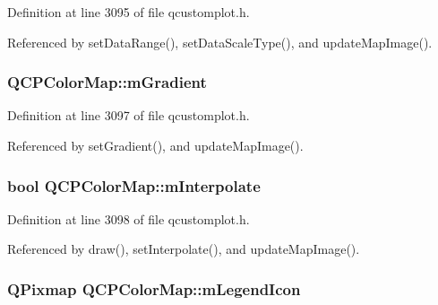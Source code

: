 Definition at line 3095 of file qcustomplot.\+h.



Referenced by set\+Data\+Range(), set\+Data\+Scale\+Type(), and update\+Map\+Image().

\hypertarget{class_q_c_p_color_map_aab77fe9a8df6f0486ab3507cc5f278fa}{}
\subsubsection[{m\+Gradient}]{ Q\+C\+P\+Color\+Map\+::m\+Gradient\hspace{0.3cm}{\ttfamily [protected]}}\label{class_q_c_p_color_map_aab77fe9a8df6f0486ab3507cc5f278fa}


Definition at line 3097 of file qcustomplot.\+h.



Referenced by set\+Gradient(), and update\+Map\+Image().

\hypertarget{class_q_c_p_color_map_af77e5eba9a844592648edeb6fbe834f1}{}
\subsubsection[{m\+Interpolate}]{\setlength{\rightskip}{0pt plus 5cm}bool Q\+C\+P\+Color\+Map\+::m\+Interpolate\hspace{0.3cm}{\ttfamily [protected]}}\label{class_q_c_p_color_map_af77e5eba9a844592648edeb6fbe834f1}


Definition at line 3098 of file qcustomplot.\+h.



Referenced by draw(), set\+Interpolate(), and update\+Map\+Image().

\hypertarget{class_q_c_p_color_map_ada522988db02cb531767d38c5029ef60}{}
\subsubsection[{m\+Legend\+Icon}]{\setlength{\rightskip}{0pt plus 5cm}Q\+Pixmap Q\+C\+P\+Color\+Map\+::m\+Legend\+Icon\hspace{0.3cm}{\ttfamily [protected]}}\label{class_q_c_p_color_map_ada522988db02cb531767d38c5029ef60}


